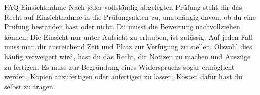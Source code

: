 \begin{artikel}{FAQ Einsichtnahme}
Nach jeder vollständig abgelegten Prüfung steht dir das Recht auf Einsichtnahme in die Prüfungsakten zu, unabhängig davon, ob du eine Prüfung bestanden hast oder nicht. Du musst die Bewertung nachvollziehen können. Die Einsicht nur unter Aufsicht zu erlauben, ist zulässig. Auf jeden Fall muss man dir ausreichend Zeit und Platz zur Verfügung zu stellen. Obwohl dies häufig verweigert wird, hast du das Recht, dir Notizen zu machen und Auszüge zu fertigen. Es muss zur Begründung eines Widerspruchs sogar ermöglicht werden, Kopien anzufertigen oder anfertigen zu lassen, Kosten dafür hast du selbst zu tragen.
\end{artikel}
